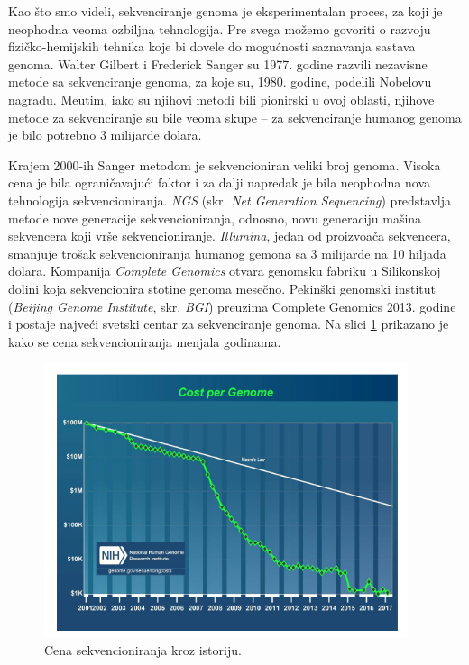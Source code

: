 Kao \v sto smo videli, sekvenciranje genoma je eksperimentalan proces, za koji je neophodna veoma ozbiljna tehnologija. Pre svega mo\v zemo govoriti o razvoju fizi\v cko-hemijskih tehnika koje bi dovele do mogu\'cnosti saznavanja sastava genoma. Walter Gilbert i Frederick Sanger su 1977. godine razvili nezavisne metode sa sekvenciranje genoma, za koje su, 1980. godine, podelili Nobelovu nagradu. Me\dj utim, iako su njihovi metodi bili pionirski u ovoj oblasti, njihove metode za sekvenciranje su bile veoma skupe -- za sekvenciranje humanog genoma je bilo potrebno 3 milijarde dolara.

Krajem 2000-ih Sanger metodom je sekvencioniran veliki broj genoma. Visoka cena je bila ograničavajući faktor i za dalji napredak je bila neophodna nova tehnologija sekvencioniranja. \emph{NGS} (skr. \emph{Net Generation Sequencing}) predstavlja metode nove generacije sekvencioniranja, odnosno, novu generaciju ma\v sina sekvencera koji vr\v se sekvencioniranje. \emph{Illumina}, jedan od proizvo\dj a\v ca sekvencera, smanjuje trošak sekvencioniranja humanog gemona sa 3 milijarde na 10 hiljada dolara. Kompanija \emph{Complete Genomics} otvara genomsku fabriku u Silikonskoj dolini koja sekvencionira stotine genoma mesečno. Pekinški genomski institut (\emph{Beijing Genome Institute}, skr. \emph{BGI}) preuzima Complete Genomics 2013. godine i postaje najveći svetski centar za sekvenciranje genoma. Na slici \ref{slika:cena} prikazano je kako se cena sekvencioniranja menjala godinama.

\begin{figure}[h]
	\centering
	\includegraphics[width=0.95\textwidth]{poglavlja/3/slike/cena_sekvencioniranja.png}
	\caption{Cena sekvencioniranja kroz istoriju.}
	\label{slika:cena}
\end{figure} 

